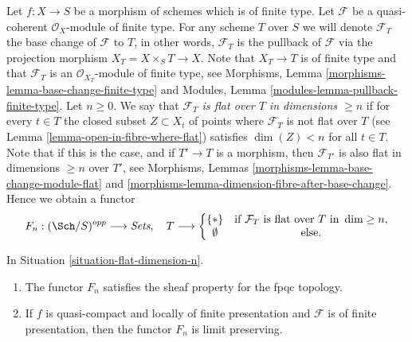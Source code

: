 \begin{situation}
\label{situation-flat-dimension-n}
Let $f : X \to S$ be a morphism of schemes which is of finite type.
Let $\mathcal{F}$ be a quasi-coherent $\mathcal{O}_X$-module of finite
type. For any scheme $T$ over $S$ we will denote $\mathcal{F}_T$ the
base change of $\mathcal{F}$ to $T$, in other words, $\mathcal{F}_T$
is the pullback of $\mathcal{F}$ via the projection morphism
$X_T = X \times_S T \to X$. Note that $X_T \to T$ is of finite type
and that $\mathcal{F}_T$ is an $\mathcal{O}_{X_T}$-module
of finite type, see
Morphisms, Lemma \ref{morphisms-lemma-base-change-finite-type} and
Modules, Lemma \ref{modules-lemma-pullback-finite-type}.
Let $n \geq 0$. We say that
{\it $\mathcal{F}_T$ is flat over $T$ in dimensions $\geq n$}
if for every $t \in T$ the closed subset $Z \subset X_t$ of points
where $\mathcal{F}_T$ is not flat over $T$ (see
Lemma \ref{lemma-open-in-fibre-where-flat})
satisfies $\dim(Z) < n$ for all $t \in T$. Note that if this is the
case, and if $T' \to T$ is a morphism, then $\mathcal{F}_{T'}$ is also
flat in dimensions $\geq n$ over $T'$, see
Morphisms, Lemmas \ref{morphisms-lemma-base-change-module-flat} and
\ref{morphisms-lemma-dimension-fibre-after-base-change}.
Hence we obtain a functor
\begin{equation}
\label{equation-flat-dimension-n}
F_n : (\Sch/S)^{opp} \longrightarrow \textit{Sets}, \quad
T \longrightarrow \left\{
\begin{matrix}
\{*\} & \text{if }\mathcal{F}_T\text{ is flat over }T\text{ in }\dim \geq n, \\
\emptyset & \text{else.}
\end{matrix}
\right.
\end{equation}
\end{situation}

\begin{lemma}
\label{lemma-flat-dimension-n}
In Situation \ref{situation-flat-dimension-n}.
\begin{enumerate}
\item The functor $F_n$ satisfies the sheaf property for the fpqc topology.
\item If $f$ is quasi-compact and locally of finite presentation
and $\mathcal{F}$ is of finite presentation, then the functor $F_n$ is
limit preserving.
\end{enumerate}
\end{lemma}

